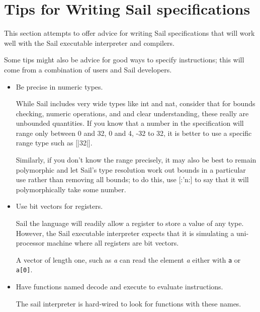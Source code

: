\documentclass[11pt]{article}
\begin{document}
\ottgrammartabular{
\ottbuiltXXinXXtypes\ottinterrule}

\ottgrammartabular{
\ottbuiltXXinXXtypeXXabbreviations\ottinterrule
\ottfunctions\ottinterrule
\ottfunctionsXXwithXXcoercions\ottinterrule}
\newpage

\section{Tips for Writing Sail specifications}

This section attempts to offer advice for writing Sail specifications
that will work well with the Sail executable interpreter and
compilers.

Some tips might also be advice for good ways to specify instructions;
this will come from a combination of users and Sail developers.

\begin{itemize}
\item Be precise in numeric types. 

While Sail includes very wide types like int and nat, consider that
for bounds checking, numeric operations, and and clear understanding,
these really are unbounded quantities. If you know that a number in
the specification will range only between 0 and 32, 0 and 4, -32 to
32, it is better to use a specific range type such as [|32|]. 

Similarly, if you don't know the range precisely, it may also be best
to remain polymorphic and let Sail's type resolution work out bounds
in a particular use rather than removing all bounds; to do this, use
[:'n:] to say that it will polymorphically take some number.

\item Use bit vectors for registers.

Sail the language will readily allow a register to store a value of
any type. However, the Sail executable interpreter expects that it is
simulating a uni-processor machine where all registers are bit
vectors.

A vector of length one, such as \emph{a} can read the element \emph{a}
either with {\tt a} or {\tt a[0]}.

\item Have functions named decode and execute to evaluate
  instructions.

The sail interpreter is hard-wired to look for functions with these names.

\end{itemize}
\end{document}
